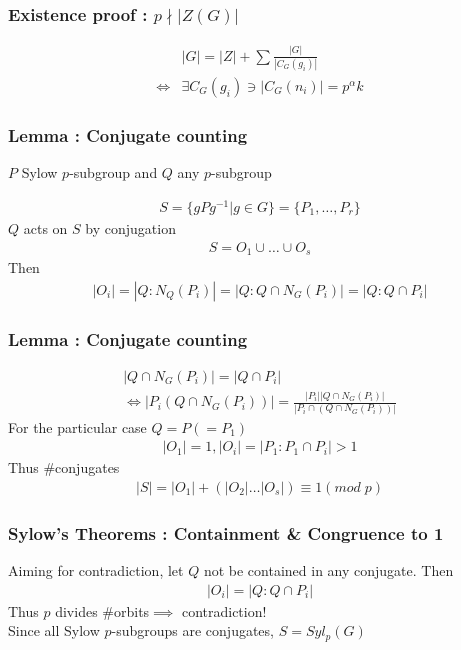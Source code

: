 \documentclass{beamer}
\begin{document}
\begin{frame}
    \frametitle{Existence proof : $p\nmid |Z(G)|$}
    \begin{align*}
        &|G| = |Z| + \sum\frac{|G|}{|C_G(g_i)|}\\ \iff&\exists C_G(g_i)\ni |C_G(n_i)| = p^\alpha k
    \end{align*}
\end{frame}

\begin{frame}
    \frametitle{Lemma : Conjugate counting}
    $P$ Sylow $p$-subgroup and $Q$ any $p$-subgroup

    \begin{gather*}
        S = \{gPg^{-1} | g\in G\} = \{P_1,\dots,P_r\}
    \end{gather*}
    $Q$ acts on $S$ by conjugation
    \begin{gather*}
        S = O_1\cup\dots\cup O_s
    \end{gather*}
    Then
    \begin{gather*}
        |O_i| = |Q:N_Q(P_i)| = |Q:Q\cap N_G(P_i)| = |Q:Q\cap P_i|
    \end{gather*}
\end{frame}

\begin{frame}
    \frametitle{Lemma : Conjugate counting}
    \begin{gather*}
        |Q\cap N_G(P_i)| = |Q\cap P_i|\\
        \iff |P_i(Q\cap N_G(P_i))| = \frac{|P_i||Q\cap N_G(P_i)|}{|P_i\cap(Q\cap N_G(P_i))|}
    \end{gather*}
    For the particular case $Q = P (= P_1)$
    \begin{gather*}
        |O_1| = 1, |O_i| = |P_1:P_1\cap P_i| > 1
    \end{gather*}
    Thus \#conjugates
    \begin{gather*}
        |S| = |O_1| + (|O_2|\dots|O_s|)\equiv 1 (mod\;p)
    \end{gather*}
\end{frame}

\begin{frame}
    \frametitle{Sylow's Theorems : Containment \& Congruence to 1}
    Aiming for contradiction, let $Q$ not be contained in any conjugate.
    Then
    \begin{gather*}
        |O_i| = |Q:Q\cap P_i|
    \end{gather*}
    Thus $p$ divides \#orbits$\implies$ contradiction!\\
    \vspace{10mm}
    Since all Sylow $p$-subgroups are conjugates, $S = Syl_p(G)$
\end{frame}
\end{document}
